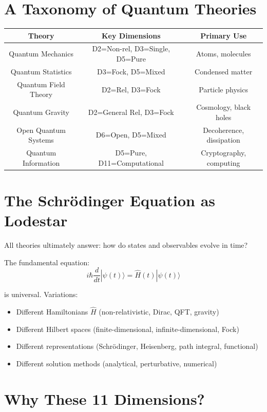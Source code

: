 \documentclass[12pt,openany,oneside]{book}
\newcommand{\ket}[1]{|#1\rangle}
\begin{document}
{{{{\section{A Taxonomy of Quantum Theories}

\begin{table}[h]
\centering
\begin{tabular}{|c|c|c|}
\hline
\textbf{Theory} & \textbf{Key Dimensions} & \textbf{Primary Use} \\
\hline
Quantum Mechanics & D2=Non-rel, D3=Single, D5=Pure & Atoms, molecules \\
\hline
Quantum Statistics & D3=Fock, D5=Mixed & Condensed matter \\
\hline
Quantum Field Theory & D2=Rel, D3=Fock & Particle physics \\
\hline
Quantum Gravity & D2=General Rel, D3=Fock & Cosmology, black holes \\
\hline
Open Quantum Systems & D6=Open, D5=Mixed & Decoherence, dissipation \\
\hline
Quantum Information & D5=Pure, D11=Computational & Cryptography, computing \\
\hline
\end{tabular}
\end{table}

\section{The Schrödinger Equation as Lodestar}

All theories ultimately answer: how do states and observables evolve in time?

The fundamental equation:
\[
i\hbar\frac{d}{dt}\ket{\psi(t)} = \hat{H}(t)\ket{\psi(t)}
\]

is universal. Variations:
\begin{itemize}
  \item Different Hamiltonians $\hat{H}$ (non-relativistic, Dirac, QFT, gravity)
  \item Different Hilbert spaces (finite-dimensional, infinite-dimensional, Fock)
  \item Different representations (Schrödinger, Heisenberg, path integral, functional)
  \item Different solution methods (analytical, perturbative, numerical)
\end{itemize}

\section{Why These 11 Dimensions?}

}}}}
\end{document}
